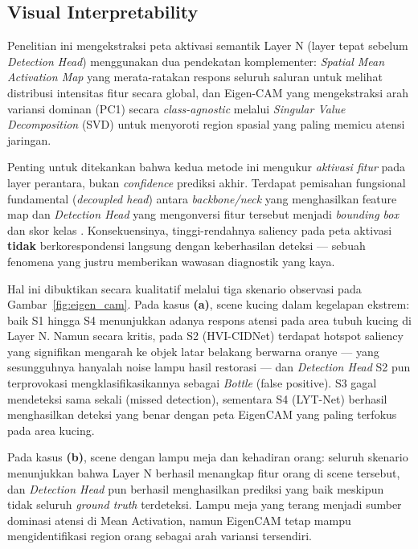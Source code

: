 \documentclass[conference]{IEEEtran}
\begin{document}

\subsection{Visual Interpretability}
Penelitian ini mengekstraksi peta aktivasi semantik Layer N (layer tepat sebelum \textit{Detection Head}) menggunakan dua pendekatan komplementer: \textit{Spatial Mean Activation Map} yang merata-ratakan respons seluruh saluran untuk melihat distribusi intensitas fitur secara global, dan Eigen-CAM yang mengekstraksi arah variansi dominan (PC1) secara \textit{class-agnostic} \cite{muhammad2020eigencam} melalui \textit{Singular Value Decomposition} (SVD) untuk menyoroti region spasial yang paling memicu atensi jaringan.

Penting untuk ditekankan bahwa kedua metode ini mengukur \textit{aktivasi fitur} pada layer perantara, bukan \textit{confidence} prediksi akhir. Terdapat pemisahan fungsional fundamental (\textit{decoupled head}) antara \textit{backbone/neck} yang menghasilkan feature map dan \textit{Detection Head} yang mengonversi fitur tersebut menjadi \textit{bounding box} dan skor kelas \cite{zhou2016cam}. Konsekuensinya, tinggi-rendahnya saliency pada peta aktivasi \textbf{tidak} berkorespondensi langsung dengan keberhasilan deteksi — sebuah fenomena yang justru memberikan wawasan diagnostik yang kaya.

Hal ini dibuktikan secara kualitatif melalui tiga skenario observasi pada Gambar~\ref{fig:eigen_cam}. Pada kasus \textbf{(a)}, scene kucing dalam kegelapan ekstrem: baik S1 hingga S4 menunjukkan adanya respons atensi pada area tubuh kucing di Layer N. Namun secara kritis, pada S2 (HVI-CIDNet) terdapat hotspot saliency yang signifikan mengarah ke objek latar belakang berwarna oranye — yang sesungguhnya hanyalah noise lampu hasil restorasi — dan \textit{Detection Head} S2 pun terprovokasi mengklasifikasikannya sebagai \textit{Bottle} (false positive). S3 gagal mendeteksi sama sekali (missed detection), sementara S4 (LYT-Net) berhasil menghasilkan deteksi yang benar dengan peta EigenCAM yang paling terfokus pada area kucing.

Pada kasus \textbf{(b)}, scene dengan lampu meja dan kehadiran orang: seluruh skenario menunjukkan bahwa Layer N berhasil menangkap fitur orang di scene tersebut, dan \textit{Detection Head} pun berhasil menghasilkan prediksi yang baik meskipun tidak seluruh \textit{ground truth} terdeteksi. Lampu meja yang terang menjadi sumber dominasi atensi di Mean Activation, namun EigenCAM tetap mampu mengidentifikasi region orang sebagai arah variansi tersendiri.
\end{document}
